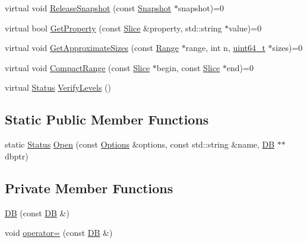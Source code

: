 \begin{DoxyCompactItemize}
\item 
virtual void \hyperlink{classleveldb_1_1_d_b_aa46de65e990bd179db0aee770af89144}{Release\+Snapshot} (const \hyperlink{classleveldb_1_1_snapshot}{Snapshot} $\ast$snapshot)=0
\item 
virtual bool \hyperlink{classleveldb_1_1_d_b_afcd557d80bac6668f20372c9e737d807}{Get\+Property} (const \hyperlink{classleveldb_1_1_slice}{Slice} \&property, std\+::string $\ast$value)=0
\item 
virtual void \hyperlink{classleveldb_1_1_d_b_ad4d54aa1dbcecc8583b013ab2d67aeff}{Get\+Approximate\+Sizes} (const \hyperlink{structleveldb_1_1_range}{Range} $\ast$range, int n, \hyperlink{stdint_8h_aaa5d1cd013383c889537491c3cfd9aad}{uint64\+\_\+t} $\ast$sizes)=0
\item 
virtual void \hyperlink{classleveldb_1_1_d_b_aeea500cbc6704454b3be6908d5da8b3a}{Compact\+Range} (const \hyperlink{classleveldb_1_1_slice}{Slice} $\ast$begin, const \hyperlink{classleveldb_1_1_slice}{Slice} $\ast$end)=0
\item 
virtual \hyperlink{classleveldb_1_1_status}{Status} \hyperlink{classleveldb_1_1_d_b_a9532ffd8cfa7e9c73994b62e91f8e49b}{Verify\+Levels} ()
\end{DoxyCompactItemize}
\subsection*{Static Public Member Functions}
\begin{DoxyCompactItemize}
\item 
static \hyperlink{classleveldb_1_1_status}{Status} \hyperlink{classleveldb_1_1_d_b_ac1da2b48e911287d86f3a3bfa0f851fe}{Open} (const \hyperlink{structleveldb_1_1_options}{Options} \&options, const std\+::string \&name, \hyperlink{classleveldb_1_1_d_b}{D\+B} $\ast$$\ast$dbptr)
\end{DoxyCompactItemize}
\subsection*{Private Member Functions}
\begin{DoxyCompactItemize}
\item 
\hyperlink{classleveldb_1_1_d_b_a6997c4b6731ad3946f2ebde601cee6fe}{D\+B} (const \hyperlink{classleveldb_1_1_d_b}{D\+B} \&)
\item 
void \hyperlink{classleveldb_1_1_d_b_a40453450c2e45d58a8e8dc8e00ada17c}{operator=} (const \hyperlink{classleveldb_1_1_d_b}{D\+B} \&)
\end{DoxyCompactItemize}


